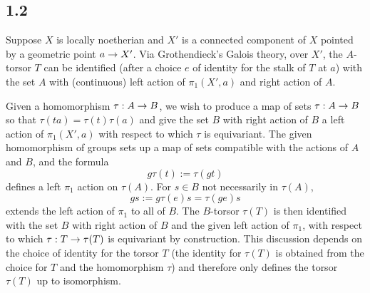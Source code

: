 \documentclass[deligne.tex]{subfiles}
\begin{document}
\subsection*{1.2}\label{sec:st1.2}
Suppose $X$ is locally noetherian and $X'$ is a connected
component of $X$ pointed by a geometric point $a\rightarrow X'$.
Via Grothendieck's Galois theory, over $X'$, the $A$-torsor $T$ can be
identified (after a choice $e$ of identity for the stalk of $T$ at $a$) with
the set $A$ with (continuous) left action of $\pi_1(X',a)$ and right action
of $A$.

Given a homomorphism $\tau:A\rightarrow B$, we wish to produce a map of sets
$\tau:A\rightarrow B$ so that $\tau(ta)=\tau(t)\tau(a)$ and give the set $B$ with 
right action of $B$ a left action of $\pi_1(X',a)$ with respect to which
$\tau$ is equivariant. The given homomorphism of groups sets up a map of sets
compatible with the actions of $A$ and $B$, and the formula
\begin{equation*}
	g\tau(t):=\tau(gt)
\end{equation*}
defines a left $\pi_1$ action on $\tau(A)$. For $s\in B$ not necessarily in
$\tau(A)$,
\begin{equation*}
	gs:=g\tau(e)s=\tau(ge)s
\end{equation*}
extends the left action of $\pi_1$ to all of $B$.
The $B$-torsor $\tau(T)$ is then identified with the set $B$ with right
action of $B$ and the given left action of $\pi_1$, with respect to which
$\tau:T\rightarrow\tau(T)$ is equivariant by construction.
This discussion depends on the choice of identity for the torsor $T$
(the identity for $\tau(T)$ is obtained from the choice for $T$ and the
homomorphism $\tau$) and therefore only defines the torsor $\tau(T)$ up to
isomorphism.
\end{document}
